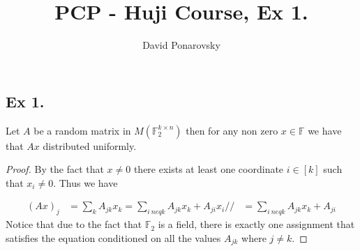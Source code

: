 \documentclass{article}
\title{PCP - Huji Course, Ex 1.}
\author{David Ponarovsky}
\newcommand{\FF}{\mathbb{F}}
\begin{document}
\maketitle
\begin{multicols*}{2}
  
  \section{Ex 1.}
  \begin{claim}
    Let $A$ be a random matrix in $M(\mathbb{F}_{2}^{k\times n})$ then for any non zero $x\in \FF$ we have that $Ax$ distributed uniformly.   
  \end{claim}
  \begin{proof}
    By the fact that $x\neq 0$ there exists at least one coordinate $i \in [k]$ such that $x_{i}\neq 0$. Thus we have 

    \begin{equation*}
      \begin{split}    
        \left( Ax \right)_{j} &= \sum_{k}{A_{jk}x_{k}} = \sum_{i \ neq k}{A_{jk}x_{k}}  + A_{ji}x_{i} //  
        & =  \sum_{i \ neq k}{A_{jk}x_{k}}  + A_{ji}
      \end{split}
    \end{equation*}
  Notice that due to the fact that $\FF_{2}$ is a field, there is exactly one assignment that satisfies the equation conditioned on all the values $A_{jk}$ where $j\neq k$.    


\end{proof}
\end{multicols*}
\end{document}
